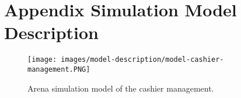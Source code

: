 \section{Appendix Simulation Model Description}\label{app:modeldescription}
\begin{figure}[!ht]
	\texttt{[image: images/model-description/model-cashier-management.PNG]}
	\caption{Arena simulation model of the cashier management.}
	\label{fig:model-cashier}
\end{figure} 
